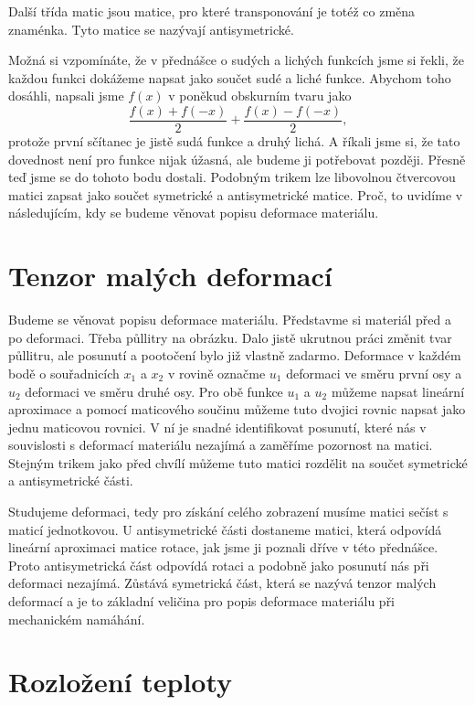 \documentclass[12pt]{article}
\begin{document}
Další třída matic jsou matice, pro které transponování je totéž co změna znaménka. Tyto matice se nazývají antisymetrické.

Možná si vzpomínáte, že v přednášce o sudých a lichých funkcích jsme si řekli, že každou funkci dokážeme napsat jako součet sudé a liché funkce. Abychom toho dosáhli, napsali jsme $f(x)$ v poněkud obskurním tvaru jako
$$\frac {f(x)+f(-x)}2 + \frac{f(x)-f(-x)}2,$$
protože první sčítanec je jistě sudá funkce a druhý lichá. A říkali jsme si, že tato dovednost není pro funkce nijak úžasná, ale budeme ji potřebovat později. Přesně teď jsme se do tohoto bodu dostali. Podobným trikem lze libovolnou čtvercovou matici zapsat jako součet symetrické a antisymetrické matice. Proč, to uvidíme v následujícím, kdy se budeme věnovat popisu deformace materiálu.


\section*{Tenzor malých deformací}

Budeme se věnovat popisu deformace materiálu. Představme si materiál před a po deformaci. Třeba půllitry na obrázku. Dalo jistě ukrutnou práci změnit tvar půllitru, ale posunutí a pootočení bylo již vlastně zadarmo. Deformace v každém bodě o souřadnicích $x_1$ a $x_2$ v rovině označme $u_1$ deformaci ve směru první osy a $u_2$ deformaci ve směru druhé osy. Pro obě funkce $u_1$ a $u_2$ můžeme napsat lineární aproximace a pomocí maticového součinu můžeme tuto dvojici rovnic napsat jako jednu maticovou rovnici. V ní je snadné identifikovat posunutí, které nás v souvislosti s deformací materiálu nezajímá a zaměříme pozornost na matici. Stejným trikem jako před chvílí můžeme tuto matici rozdělit na součet symetrické a antisymetrické části.

Studujeme deformaci, tedy pro získání celého zobrazení musíme matici sečíst s maticí jednotkovou. U antisymetrické části dostaneme matici, která odpovídá lineární aproximaci matice rotace, jak jsme ji poznali dříve v této přednášce. Proto antisymetrická část odpovídá rotaci a podobně jako posunutí nás při deformaci nezajímá. Zůstává symetrická část, která se nazývá tenzor malých deformací a je to základní veličina pro popis deformace materiálu při mechanickém namáhání. 


\section*{Rozložení teploty}
\end{document}
